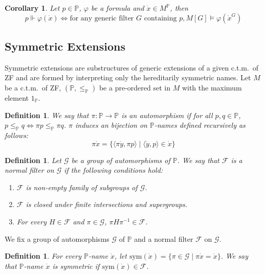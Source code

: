 \documentclass{report}
\newtheorem{dfn}[thm]{Definition}
\newtheorem{cor}[thm]{Corollary}
\begin{document}
\begin{cor}\label{cor:truth_lemma_cor}
  Let $p \in \mathbb{P}$, $\varphi$ be a formula and $\dot{x} \in M^{\mathbb{P}}$, then
  $$p \Vdash \varphi(\dot{x}) \Leftrightarrow \text{for any generic filter } G \text{ containing } p, M[G] \vDash \varphi(\dot{x}^G)$$
\end{cor}

\subsection{Symmetric Extensions}\label{subsection:symmetrc_extensions}
Symmetric extensions are substructures of generic extensions of a given c.t.m.\  of ZF 
and are formed by interpreting only the hereditarily symmetric names.
Let $M$ be a c.t.m.\  of ZF, $(\mathbb{P}, \leq_{\mathbb{P}})$ be a pre-ordered set in $M$ with the maximum element $1_{\mathbb{P}}$.

\begin{dfn} \label{dfn:automorphism}
  We say that $\pi : \mathbb{P} \rightarrow \mathbb{P}$ is an \emph{automorphism} if for all $p, q \in \mathbb{P}$, $p \leq_{\mathbb{P}} q \Leftrightarrow \pi p \leq_{\mathbb{P}} \pi q$.
  $\pi$ induces an bijection on $\mathbb{P}$-names defined recursively as follows:
  $$ \pi \dot{x} = \{ \langle \pi \dot{y}, \pi p \rangle \mid \langle \dot{y}, p \rangle \in \dot{x} \} $$
\end{dfn}

\begin{dfn} 
  Let $\mathcal{G}$ be a group of automorphisms of $\mathbb{P}$. We say that $\mathcal{F}$ is a \emph{normal filter} on $\mathcal{G}$ if the following conditions hold:
  \begin{enumerate}
    \item $\mathcal{F}$ is non-empty family of subgroups of $\mathcal{G}$.
    \item $\mathcal{F}$ is closed under finite intersections and supergroups.
    \item For every $H \in \mathcal{F}$ and $\pi \in \mathcal{G}$, $\pi H \pi^{-1} \in \mathcal{F}$.
  \end{enumerate}
\end{dfn}

We fix a group of automorphisms $\mathcal{G}$ of $\mathbb{P}$ and a normal filter $\mathcal{F}$ on $\mathcal{G}$.
\begin{dfn} 
  For every $\mathbb{P}$-name $\dot{x}$, let $\mathrm{sym}(\dot{x}) = \{ \pi \in \mathcal{G} \mid \pi \dot{x} = \dot{x} \}$.
  We say that $\mathbb{P}$-name $\dot{x}$ is \emph{symmetric} if $\mathrm{sym}(\dot{x}) \in \mathcal{F}$.
\end{dfn}
\end{document}
